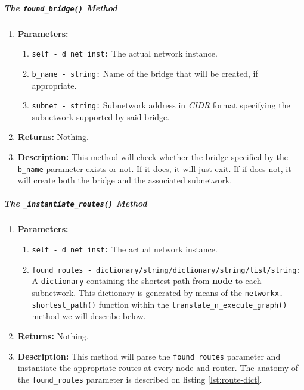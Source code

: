     \subparagraph{The \texttt{found\_bridge()} Method}
        \begin{enumerate}
            \item \textbf{Parameters:}
            \begin{enumerate}
                \item \texttt{self - d\_net\_inst:} The actual network instance.
                \item \texttt{b\_name - string:} Name of the bridge that will be created, if appropriate.
                \item \texttt{subnet - string:} Subnetwork address in \textit{CIDR} format specifying the subnetwork supported by said bridge.
            \end{enumerate}
            \item \textbf{Returns:} Nothing.
            \item \textbf{Description:} This method will check whether the bridge specified by the \texttt{b\_name} parameter exists or not. If it does, it will just exit. If if does not, it will create both the bridge and the associated subnetwork.
        \end{enumerate}

    \subparagraph{The \texttt{\_instantiate\_routes()} Method}
        \begin{enumerate}
            \item \textbf{Parameters:}
            \begin{enumerate}
                \item \texttt{self - d\_net\_inst:} The actual network instance.
                \item \texttt{found\_routes - dictionary/string/dictionary/string/list/string:} A \texttt{dictionary} containing the shortest path from \textbf{node} to each subnetwork. This dictionary is generated by means of the \texttt{\allowbreak networkx. shortest\_path()} function within the \texttt{translate\_n\_execute\_graph()} method we will describe below.
            \end{enumerate}
            \item \textbf{Returns:} Nothing.
            \item \textbf{Description:} This method will parse the \texttt{found\_routes} parameter and instantiate the appropriate routes at every node and router. The anatomy of the \texttt{found\_routes} parameter is described on listing \ref{lst:route-dict}.
        \end{enumerate}

